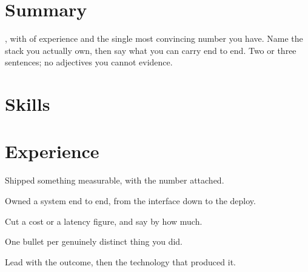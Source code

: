\documentclass{deedy-resume-openfont}
\begin{document}


\section{Summary}

, with  of experience and the
single most convincing number you have. Name the stack you actually own, then say what
you can carry end to end. Two or three sentences; no adjectives you cannot evidence.

\section{Skills}


\section{Experience}

\begin{tightemize}
  \item Shipped something measurable, with the number attached.
  \item Owned a system end to end, from the interface down to the deploy.
  \item Cut a cost or a latency figure, and say by how much.
\end{tightemize}

\entrysep
{}
\begin{tightemize}
  \item One bullet per genuinely distinct thing you did.
  \item Lead with the outcome, then the technology that produced it.
\end{tightemize}
\end{document}
